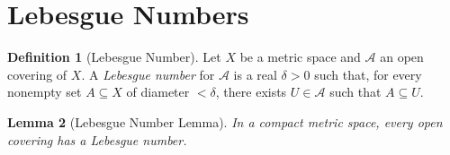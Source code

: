 \documentclass{report}
\newtheorem{lm}{Lemma}[section]
\theoremstyle{definition}
\newtheorem{df}[lm]{Definition}
\begin{document}
  \section{Lebesgue Numbers}

  \begin{df}[Lebesgue Number]
    Let $X$ be a metric space and $\mathcal{A}$ an open covering of $X$. A
    \emph{Lebesgue number} for $\mathcal{A}$ is a real $\delta > 0$ such that,
    for every nonempty set $A \subseteq X$ of diameter $< \delta$, there exists
    $U \in \mathcal{A}$ such that $A \subseteq U$.
  \end{df}

  \begin{lm}[Lebesgue Number Lemma]
    In a compact metric space, every open covering has a Lebesgue number.
  \end{lm}
\end{document}
